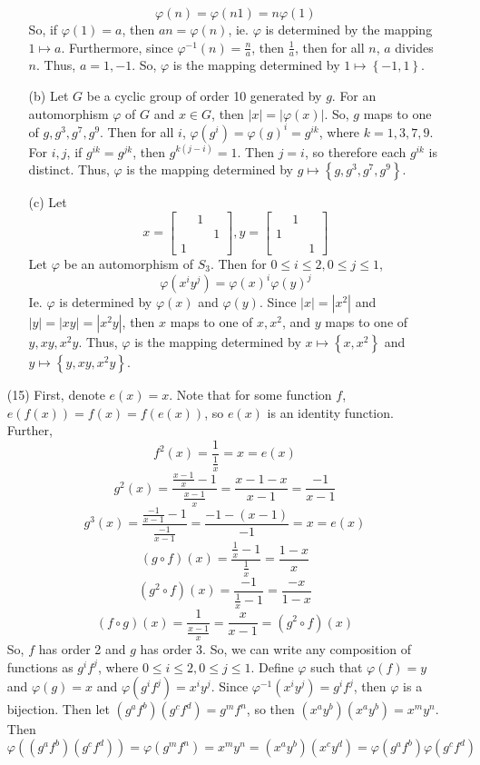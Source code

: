 \begin{itemize}
\begin{itemize}
$$\varphi(n) = \varphi(n1) = n\varphi(1)$$
So, if $\varphi(1) = a$, then $an = \varphi(n)$, ie. $\varphi$ is determined by the mapping $1 \mapsto a$. Furthermore, since $\varphi^{-1}(n) = \frac{n}{a}$, then $\frac{1}{a}$, then for all $n$, $a$ divides $n$. Thus, $a = 1, -1$. So, $\varphi$ is the mapping determined by $1 \mapsto \left\lbrace -1, 1 \right\rbrace$.
\item[(b)]
Let $G$ be a cyclic group of order 10 generated by $g$. For an automorphism $\varphi$ of $G$ and $x \in G$, then $|x| = |\varphi(x)|$. So, $g$ maps to one of $g, g^3, g^7, g^9$. Then for all $i$, $\varphi(g^i) = \varphi(g)^i = g^{ik}$, where $k = 1, 3, 7, 9$. For $i, j$, if $g^{ik} = g^{jk}$, then $g^{k(j - i)} = 1$. Then $j = i$, so therefore each $g^{ik}$ is distinct. Thus, $\varphi$ is the mapping determined by $g \mapsto \left\lbrace g, g^3, g^7, g^9 \right\rbrace$.
\item[(c)]
Let
$$x = \begin{bmatrix}
& 1 \\
& & 1 \\
1
\end{bmatrix}, y = \begin{bmatrix}
& 1 \\
1 \\
& & 1
\end{bmatrix}$$
Let $\varphi$ be an automorphism of $S_3$. Then for $0 \leq i \leq 2,  0\leq j \leq 1$, 
$$\varphi(x^iy^j) = \varphi(x)^i\varphi(y)^j$$
Ie. $\varphi$ is determined by $\varphi(x)$ and $\varphi(y)$. Since $|x| = |x^2|$ and $|y| = |xy| = |x^2y|$, then $x$ maps to one of $x, x^2$, and $y$ maps to one of $y, xy, x^2y$. Thus, $\varphi$ is the mapping determined by $x \mapsto \left\lbrace x, x^2 \right\rbrace$ and $y \mapsto \left\lbrace y, xy, x^2y \right\rbrace$.
\end{itemize}
\item[(15)]
First, denote $e(x) = x$. Note that for some function $f$, $e(f(x)) = f(x) = f(e(x))$, so $e(x)$ is an identity function. Further,
$$f^2(x) = \frac{1}{\frac{1}{x}} = x = e(x)$$
$$g^2(x) = \frac{\frac{x-1}{x} - 1}{\frac{x-1}{x}} = \frac{x- 1 - x}{x - 1} = \frac{-1}{x-1}$$
$$g^3(x) = \frac{\frac{-1}{x-1}-1}{\frac{-1}{x-1}} = \frac{-1 - (x-1)}{-1} = x = e(x)$$
$$(g \circ f)(x) = \frac{\frac{1}{x} - 1}{\frac{1}{x}} = \frac{1 - x}{x}$$
$$(g^2 \circ f)(x) = \frac{-1}{\frac{1}{x} - 1} = \frac{-x}{1 - x}$$
$$(f \circ g)(x) = \frac{1}{\frac{x-1}{x}} = \frac{x}{x-1} = (g^2 \circ f)(x)$$
So, $f$ has order 2 and $g$ has order 3. So, we can write any composition of functions as $g^if^j$, where $0 \leq i \leq 2, 0 \leq j \leq 1$. Define $\varphi$ such that $\varphi(f) = y$ and $\varphi(g) = x$ and $\varphi(g^if^j) = x^iy^j$. Since $\varphi^{-1}(x^iy^j) = g^if^j$, then $\varphi$ is a bijection. Then let $(g^af^b)(g^cf^d) = g^mf^n$, so then $(x^ay^b)(x^ay^b) = x^my^n$. Then $$\varphi((g^af^b)(g^cf^d)) = \varphi(g^mf^n) = x^my^n = (x^ay^b)(x^cy^d) = \varphi(g^af^b)\varphi(g^cf^d)$$

\end{itemize}
